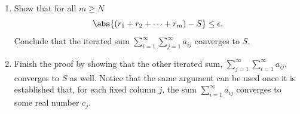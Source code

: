 \documentclass{lew98_solutions}
\begin{document}
\begin{exercise}
\label{ex:2.8.5}
    \begin{enumerate}
        \item Show that for all \( m \geq N \)
        \[
            \abs{(r_1 + r_2 + \cdots + r_m) - S} \leq \epsilon.
        \]
        Conclude that the iterated sum \( \sum_{i=1}^{\infty} \sum_{j=1}^{\infty} a_{ij} \) converges to \( S \).

        \item Finish the proof by showing that the other iterated sum, \( \sum_{j=1}^{\infty} \sum_{i=1}^{\infty} a_{ij} \), converges to \( S \) as well. Notice that the same argument can be used once it is established that, for each fixed column \( j \), the sum \( \sum_{i=1}^{\infty} a_{ij} \) converges to some real number \( c_j \).
    \end{enumerate}
\end{exercise}
\end{document}
